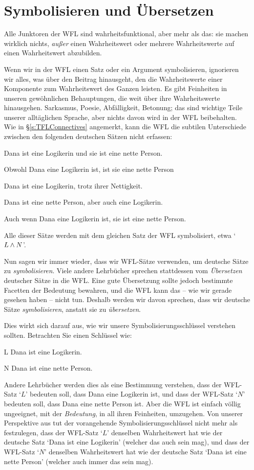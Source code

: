 \section{Symbolisieren und Übersetzen}
Alle Junktoren der WFL sind wahrheitsfunktional, aber mehr als das: sie machen wirklich nichts, \emph{au{\ss}er} einen Wahrheitswert oder mehrere Wahrheitswerte auf einen Wahrheitswert abzubilden.

Wenn wir in der WFL einen Satz oder ein Argument symbolisieren, ignorieren wir alles, was über den Beitrag hinausgeht, den die Wahrheitswerte einer Komponente zum Wahrheitswert des Ganzen leisten. Es gibt Feinheiten in unseren gewöhnlichen Behauptungen, die weit über ihre Wahrheitswerte hinausgehen. Sarkasmus, Poesie, Abfälligkeit, Betonung; das sind wichtige Teile unserer alltäglichen Sprache, aber nichts davon wird in der WFL beibehalten. Wie in \S\ref{s:TFLConnectives} angemerkt, kann die WFL die subtilen Unterschiede zwischen den folgenden deutschen Sätzen nicht erfassen:
	\begin{earg}
		\item Dana ist eine Logikerin und sie ist eine nette Person.
		\item Obwohl Dana eine Logikerin ist, ist sie eine nette Person
		\item Dana ist eine Logikerin, trotz ihrer Nettigkeit.
		\item Dana ist eine nette Person, aber auch eine Logikerin.
		\item Auch wenn Dana eine Logikerin ist, sie ist eine nette Person.
	\end{earg}
Alle dieser Sätze werden mit dem gleichen Satz der WFL symbolisiert, etwa `$L \wedge N$'.

Nun sagen wir immer wieder, dass wir WFL-Sätze verwenden, um deutsche Sätze zu \emph{symbolisieren}. Viele andere Lehrbücher sprechen stattdessen vom \emph{Übersetzen} deutscher Sätze in die WFL. Eine gute Übersetzung sollte jedoch bestimmte Facetten der Bedeutung bewahren, und die WFL kann das -- wie wir gerade gesehen haben -- nicht tun. Deshalb werden wir davon sprechen, dass wir deutsche Sätze \emph{symbolisieren}, anstatt sie zu \emph{übersetzen}.

Dies wirkt sich darauf aus, wie wir unsere Symbolisierungsschlüssel verstehen sollten. Betrachten Sie einen Schlüssel wie:
	\begin{ekey}
		\item[L] Dana ist eine Logikerin.
		\item[N] Dana ist eine nette Person.
	\end{ekey}
Andere Lehrbücher werden dies als eine Bestimmung verstehen, dass der WFL-Satz `$L$' bedeuten soll, dass Dana eine Logikerin ist, und dass der WFL-Satz `$N$' bedeuten soll, dass Dana eine nette Person ist. Aber die WFL ist einfach völlig ungeeignet, mit der \emph{Bedeutung}, in all ihren Feinheiten, umzugehen. Von unserer Perspektive aus tut der vorangehende Symbolisierungsschlüssel nicht mehr als festzulegen, dass der WFL-Satz `$L$' denselben Wahrheitswert hat wie der deutsche Satz `Dana ist eine Logikerin' (welcher das auch sein mag), und dass der WFL-Satz `$N$' denselben Wahrheitswert hat wie der deutsche Satz `Dana ist eine nette Person' (welcher auch immer das sein mag).

